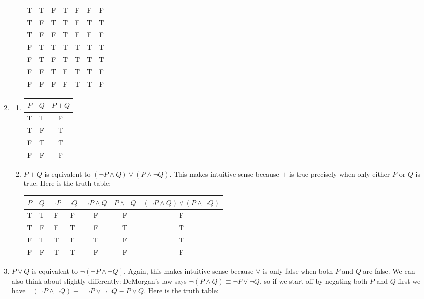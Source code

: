 \documentclass{article}
\begin{document}
\begin{enumerate}
\begin{enumerate}
\begin{tabular}{c c c c c c c}
      T & T & F & T & F & F & F \\
      T & F & T & T & F & T & T \\
      T & F & F & T & F & F & F \\
      F & T & T & T & T & T & T \\
      F & T & F & T & T & T & T \\
      F & F & T & F & T & T & F \\
      F & F & F & F & T & T & F \\
      \end{tabular}
  \end{enumerate}
\item
  \begin{enumerate}
  \item
    \begin{tabular}{c c c}
      $P$ & $Q$ & $P + Q$ \\ \hline
      T & T & F \\
      T & F & T \\
      F & T & T \\
      F & F & F \\
    \end{tabular}
  \item $P + Q$ is equivalent to $(\lnot P \land Q) \lor (P \land \lnot Q)$.  This makes intuitive sense because $+$ is true precisely when only either $P$ or $Q$ is true.  Here is the truth table:

    \begin{tabular}{c c c c c c c}
      $P$ & $Q$ & $\lnot P$ & $\lnot Q$ & $\lnot P \land Q$ & $P \land \lnot Q$ & $(\lnot P \land Q) \lor (P \land \lnot Q)$ \\ \hline
      T & T & F & F & F & F & F \\
      T & F & F & T & F & T & T \\
      F & T & T & F & T & F & T \\
      F & F & T & T & F & F & F \\
      \end{tabular}
  \end{enumerate}
\item
  $P \lor Q$ is equivalent to $\lnot (\lnot P \land \lnot Q)$.	Again, this makes intuitive sense because $\lor$ is only false when both $P$ and $Q$ are false.	 We can also think about slightly differently: DeMorgan's law says $\lnot (P \land Q) \equiv \lnot P \lor \lnot Q$, so if we start off by negating both $P$ and $Q$ first we have $\lnot (\lnot P \land \lnot Q) \equiv \lnot\lnot P \lor \lnot\lnot Q \equiv P \lor Q$.  Here is the truth table:


\end{enumerate}
\end{document}
